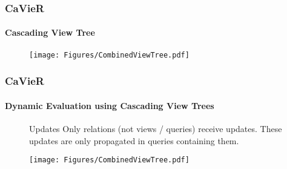 \documentclass[
	11pt, %
]{beamer}
\begin{document}
\begin{frame}
	\frametitle{CaVieR}
	\framesubtitle{Cascading View Tree}
	\begin{figure}
		\begin{minipage}{0.5\textwidth}
		\end{minipage}
		\begin{minipage}{0.49\textwidth}
			\vspace{-0.8cm}
			\texttt{[image: Figures/CombinedViewTree.pdf]}
		\end{minipage}
	\end{figure}
\end{frame}


\begin{frame}
	\frametitle{CaVieR}
	\framesubtitle{Dynamic Evaluation using Cascading View Trees}
	\begin{figure}
		\begin{minipage}{0.5\textwidth}
			\begin{block}{Updates}
				Only relations (not views / queries) receive updates. These updates are only propagated in queries containing them.
			\end{block}
		\end{minipage}
		\begin{minipage}{0.49\textwidth}
			\vspace{-0.8cm}
			\texttt{[image: Figures/CombinedViewTree.pdf]}
		\end{minipage}
	\end{figure}
\end{frame}
\end{document}
